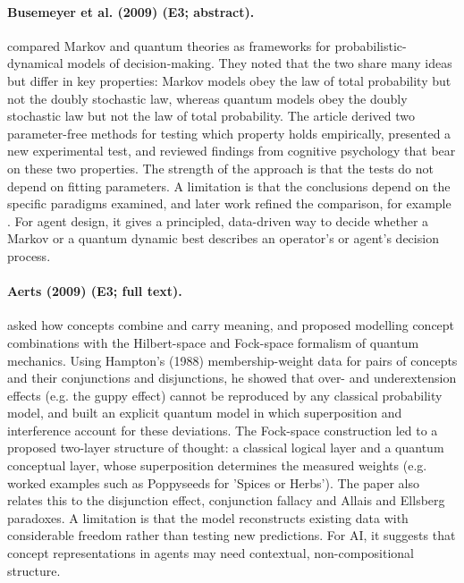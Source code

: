 \documentclass[10pt,a4paper]{article}
\begin{document}
\paragraph{Busemeyer et al. (2009) (E3; abstract).} \citet{Busemeyer2009} compared Markov and quantum theories as frameworks for probabilistic-dynamical models of decision-making. They noted that the two share many ideas but differ in key properties: Markov models obey the law of total probability but not the doubly stochastic law, whereas quantum models obey the doubly stochastic law but not the law of total probability. The article derived two parameter-free methods for testing which property holds empirically, presented a new experimental test, and reviewed findings from cognitive psychology that bear on these two properties. The strength of the approach is that the tests do not depend on fitting parameters. A limitation is that the conclusions depend on the specific paradigms examined, and later work refined the comparison, for example \citep{Busemeyer2020}. For agent design, it gives a principled, data-driven way to decide whether a Markov or a quantum dynamic best describes an operator's or agent's decision process.

\paragraph{Aerts (2009) (E3; full text).} \citet{Aerts2009} asked how concepts combine and carry meaning, and proposed modelling concept combinations with the Hilbert-space and Fock-space formalism of quantum mechanics. Using Hampton's (1988) membership-weight data for pairs of concepts and their conjunctions and disjunctions, he showed that over- and underextension effects (e.g. the guppy effect) cannot be reproduced by any classical probability model, and built an explicit quantum model in which superposition and interference account for these deviations. The Fock-space construction led to a proposed two-layer structure of thought: a classical logical layer and a quantum conceptual layer, whose superposition determines the measured weights (e.g. worked examples such as Poppyseeds for 'Spices or Herbs'). The paper also relates this to the disjunction effect, conjunction fallacy and Allais and Ellsberg paradoxes. A limitation is that the model reconstructs existing data with considerable freedom rather than testing new predictions. For AI, it suggests that concept representations in agents may need contextual, non-compositional structure.
\end{document}
